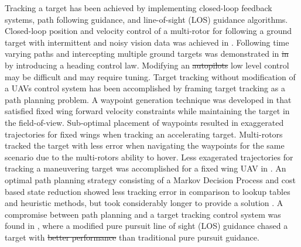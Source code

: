 \documentclass[conference]{IEEEtran}
\providecommand{\DIFadd}[1]{{\protect\color{blue}\uwave{#1}}} %
\providecommand{\DIFdel}[1]{{\protect\color{red}\sout{#1}}}                      %
\providecommand{\DIFaddbegin}{} %
\providecommand{\DIFaddend}{} %
\providecommand{\DIFdelbegin}{} %
\providecommand{\DIFdelend}{} %
\newcommand{\DIFscaledelfig}{0.5}
\newlength{\DIFdelgraphicswidth} %
\newlength{\DIFdelgraphicsheight} %
\newcommand{\DIFaddincludegraphics}[2][]{{\color{blue}\fbox{\DIFOincludegraphics[#1]{#2}}}} %
\newcommand{\DIFdelincludegraphics}[2][]{%
\sbox{\DIFdelgraphicsbox}{\DIFOincludegraphics[#1]{#2}}%
\settoboxwidth{\DIFdelgraphicswidth}{\DIFdelgraphicsbox} %
\settoboxtotalheight{\DIFdelgraphicsheight}{\DIFdelgraphicsbox} %
\scalebox{\DIFscaledelfig}{%
\parbox[b]{\DIFdelgraphicswidth}{\usebox{\DIFdelgraphicsbox}\\[-\baselineskip] \rule{\DIFdelgraphicswidth}{0em}}\llap{\resizebox{\DIFdelgraphicswidth}{\DIFdelgraphicsheight}{%
\setlength{\unitlength}{\DIFdelgraphicswidth}%
\begin{picture}(1,1)%
\thicklines\linethickness{2pt} %
{\color[rgb]{1,0,0}\put(0,0){\framebox(1,1){}}}%
{\color[rgb]{1,0,0}\put(0,0){\line( 1,1){1}}}%
{\color[rgb]{1,0,0}\put(0,1){\line(1,-1){1}}}%
\end{picture}%
}\hspace*{3pt}}} %
} %
\DeclareRobustCommand{\DIFaddbegin}{\DIFOaddbegin \let\includegraphics\DIFaddincludegraphics} %
\DeclareRobustCommand{\DIFaddend}{\DIFOaddend \let\includegraphics\DIFOincludegraphics} %
\DeclareRobustCommand{\DIFdelbegin}{\DIFOdelbegin \let\includegraphics\DIFdelincludegraphics} %
\DeclareRobustCommand{\DIFdelend}{\DIFOaddend \let\includegraphics\DIFOincludegraphics} %
\begin{document}
Tracking a target has been achieved by implementing closed-loop feedback systems, path following guidance, and line-of-sight (LOS) guidance algorithms. Closed-loop position and velocity control of a multi-rotor for following a ground target with intermittent and noisy vision data was achieved in \cite{teuliere_chasing_2011}. Following time varying paths and intercepting multiple ground targets was demonstrated in \DIFdelbegin \DIFdel{in }\DIFdelend \cite{oliveira_moving_2016} by introducing a heading control law. Modifying an \DIFdelbegin \DIFdel{autopilots }\DIFdelend \DIFaddbegin \DIFadd{autopilot's }\DIFaddend low level control may be difficult and may require tuning.
Target tracking without modification of a UAVs control system has been accomplished by framing target tracking as a path planning problem. A waypoint generation technique was developed in \cite{ariyur_autonomous_2008} that satisfied fixed wing forward velocity constraints while maintaining the target in the field-of-view. Sub-optimal placement of waypoints resulted in exaggerated trajectories for fixed wings when tracking an accelerating target. Multi-rotors tracked the target with less error when navigating the waypoints for the same scenario due to the multi-rotors ability to hover. Less exagerated trajectories for tracking a maneuvering target was accomplished for a fixed wing UAV in \cite{lee_strategies_2003}. An optimal path planning strategy consisting of a Markov Decision Process and cost based state reduction showed less tracking error in comparison to lookup tables and heuristic methods, but took considerably longer to provide a solution \cite{baek_optimal_2013}. A compromise between path planning and a target tracking control system was found in \cite{yamasaki_advanced_2009}, where a modified pure pursuit line of sight (LOS) guidance chased a target with \DIFdelbegin \DIFdel{better performance }\DIFdelend \DIFaddbegin \DIFadd{less tracking error }\DIFaddend than traditional pure pursuit guidance\cite{yamasaki_advanced_2009}. 
\end{document}
